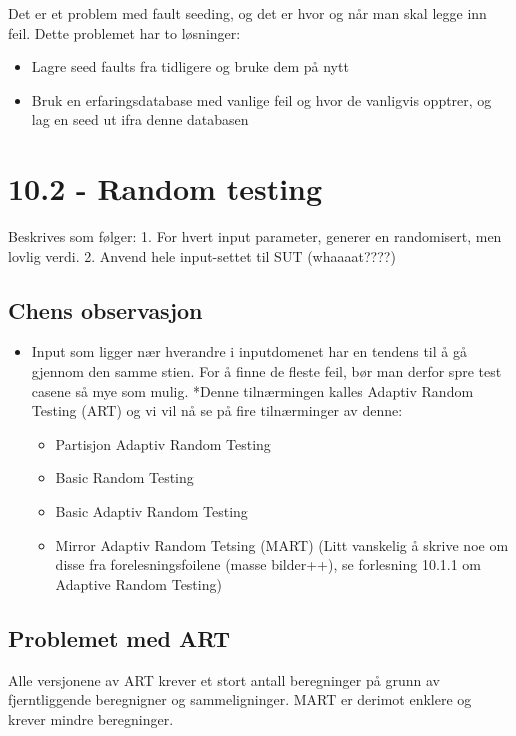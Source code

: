 Det er et problem med fault seeding, og det er hvor og når man skal
legge inn feil. Dette problemet har to løsninger:

\begin{itemize}
\item
  Lagre seed faults fra tidligere og bruke dem på nytt
\item
  Bruk en erfaringsdatabase med vanlige feil og hvor de vanligvis
  opptrer, og lag en seed ut ifra denne databasen
\end{itemize}
\section{10.2 - Random testing}

Beskrives som følger: 1. For hvert input parameter, generer en
randomisert, men lovlig verdi. 2. Anvend hele input-settet til SUT
(whaaaat????)

\subsection{Chens observasjon}

\begin{itemize}
\item
  Input som ligger nær hverandre i inputdomenet har en tendens til å gå
  gjennom den samme stien. For å finne de fleste feil, bør man derfor
  spre test casene så mye som mulig. *Denne tilnærmingen kalles Adaptiv
  Random Testing (ART) og vi vil nå se på fire tilnærminger av denne:
  \begin{itemize}
  \item
    Partisjon Adaptiv Random Testing
  \item
    Basic Random Testing
  \item
    Basic Adaptiv Random Testing
  \item
    Mirror Adaptiv Random Tetsing (MART) (Litt vanskelig å skrive noe om
    disse fra forelesningsfoilene (masse bilder++), se forlesning 10.1.1
    om Adaptive Random Testing)
  \end{itemize}
\end{itemize}
\subsection{Problemet med ART}

Alle versjonene av ART krever et stort antall beregninger på grunn av
fjerntliggende beregnigner og sammeligninger. MART er derimot enklere og
krever mindre beregninger.

